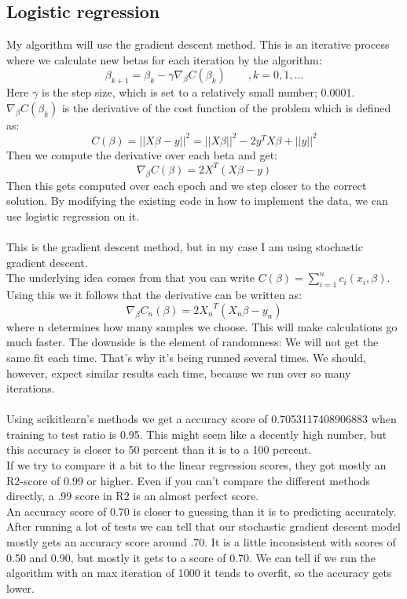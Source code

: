 \documentclass[a4paper,norsk]{article}
\begin{document}
\subsection{Logistic regression}
My algorithm will use the gradient descent method. This is an iterative process where we calculate new betas for each iteration by the algorithm:
$$
\beta_{k+1} = \beta_{k} - \gamma \nabla_{\beta} C(\beta_{k}) \qquad,k = 0, 1, ...
$$
Here $\gamma$ is the step size, which is set to a relatively small number; 0.0001. $\nabla_{\beta} C(\beta_{k})$ is the derivative of the cost function of the problem which is defined as:
$$
C(\beta) = || X\beta - y ||^2 = ||X\beta||^2 - 2y^T X \beta + ||y||^2
$$
Then we compute the derivative over each beta and get:
$$
\nabla_\beta C(\beta) = 2 X^T (X\beta - y)
$$
Then this gets computed over each epoch and we step closer to the correct solution.
By modifying the existing code in how to implement the data, we can use logistic regression on it.\\
\\
This is the gradient descent method, but in my case I am using stochastic gradient descent.\\
The underlying idea comes from that you can write $ C(\beta) = \sum^{n}_{i=1} c_i (x_i, \beta)$. Using this we it follows that the derivative can be written as:
$$\nabla_\beta C_n (\beta) = 2 {X_ n}^T ({X_n}\beta - y_n)$$
where n determines how many samples we choose. This will make calculations go much faster. The downside is the element of randomness: We will not get the same fit each time. That's why it's being runned several times. We should, however, expect similar results each time, because we run over so many iterations.\\
\\
Using scikitlearn's methods we get a accuracy score of 0.7053117408906883 when training to test ratio is 0.95. This might seem like a decently high number, but this accuracy is closer to 50 percent than it is to a 100 percent.\\
If we try to compare it a bit to the linear regression scores, they got mostly an R2-score of 0.99 or higher. Even if you can't compare the different methods directly, a .99 score in R2 is an almost perfect score.\\
An accuracy score of 0.70 is closer to guessing than it is to predicting accurately.\\
After running a lot of tests we can tell that our stochastic gradient descent model mostly gets an accuracy score around .70. It is a little inconsistent with scores of 0.50 and 0.90, but mostly it gets to a score of 0.70. We can tell if we run the algorithm with an max iteration of 1000 it tends to overfit, so the accuracy gets lower.\\
\end{document}
